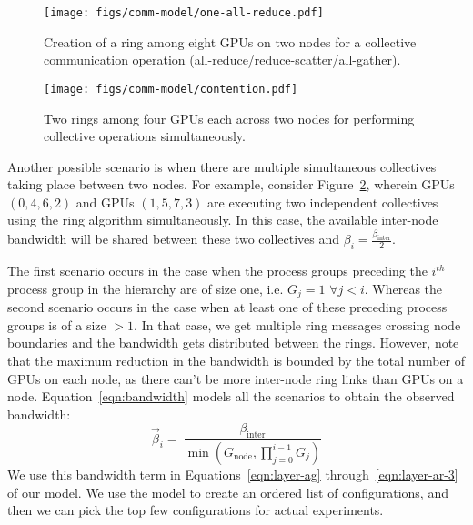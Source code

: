 \begin{figure}[h]
    \centering
       \texttt{[image: figs/comm-model/one-all-reduce.pdf]}
       \caption{Creation of a ring among eight GPUs on two nodes for a collective communication operation (all-reduce/reduce-scatter/all-gather).}
       \label{fig:all-reduce-one}
\end{figure}

\begin{figure}[h]
    \centering
       \texttt{[image: figs/comm-model/contention.pdf]}
       \caption{Two rings among four GPUs each across two nodes for performing collective operations simultaneously.}
       \label{fig:all-reduce-many}
\end{figure}

Another possible scenario is when there are multiple simultaneous collectives taking place between two nodes. For example, consider 
Figure~\ref{fig:all-reduce-many}, wherein GPUs $(0, 4, 6, 2)$ and GPUs $(1, 5, 7, 3)$ are executing two independent collectives using the ring algorithm
simultaneously. In this case, the available inter-node bandwidth will be shared between these two collectives and 
$\beta_{i}=\frac{\beta_{\mathrm{inter}}}{2}$. 

The first scenario occurs in the case when the process groups preceding the $i^{\mathit{th}}$ process 
group in the hierarchy are of size one, i.e. $G_{j}=1$  $\forall j < i$. Whereas the second scenario occurs in the case 
when at least one of these preceding process groups is of a size $>1$. In that case, we get multiple ring messages crossing node boundaries
and the bandwidth gets distributed between the rings. However, note that the maximum
reduction in the bandwidth is bounded by the total number of GPUs on each node, as there can't be more 
inter-node ring links than GPUs on a node. Equation~\ref{eqn:bandwidth} models all the scenarios to obtain the observed bandwidth:
\begin{equation}
\vec{\beta}_{i} = \
         \dfrac{\beta_{\text{inter}}}{\min \left( G_{\text{node}}, \prod_{j=0}^{i-1}G_{j} \right)} \label{eqn:bandwidth}
\end{equation}
We use this bandwidth term in Equations~\ref{eqn:layer-ag}
through~\ref{eqn:layer-ar-3} of our model. We use the model to create an
ordered list of configurations, and then we can pick the top few configurations
for actual experiments.

